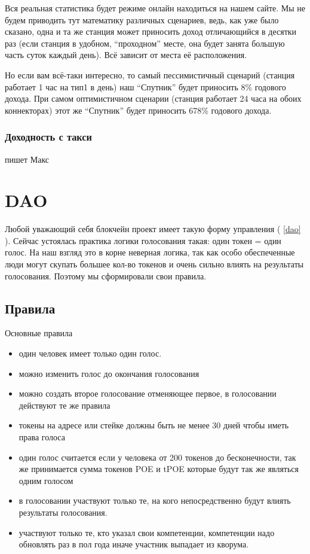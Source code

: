 \documentclass[a4paper,12pt]{report}
\begin{document}
Вся реальная статистика будет режиме онлайн находиться на нашем сайте. Мы не будем приводить тут математику различных сценариев, ведь, как уже было сказано, одна и та же станция может приносить доход отличающийся в десятки раз (если станция в удобном, “проходном” месте, она будет занята большую часть суток каждый день). Всё зависит от места её расположения.

Но если вам всё-таки интересно, то самый пессимистичный сценарий (станция работает 1 час на тип1 в день) наш “Спутник” будет приносить 8\% годового дохода. При самом оптимистичном сценарии (станция работает 24 часа на обоих коннекторах) этот же “Спутник” будет приносить 678\% годового дохода.


\subsection{Доходность с такси}

пишет Макс

\chapter{DAO}

Любой уважающий себя блокчейн проект имеет такую форму управления ( \ref{dao} ). Сейчас устоялась практика логики голосования такая: один токен = один голос. На наш взгляд это в корне неверная логика, так как особо обеспеченные люди могут скупать большее кол-во токенов и очень сильно влиять на результаты голосования. Поэтому мы сформировали свои правила.

\section{Правила}

Основные правила

\begin{itemize}
	\item один человек имеет только один голос.
	\item можно изменить голос до окончания голосования
	\item можно создать второе голосование отменяющее первое, в голосовании действуют те же правила
	\item токены на адресе или стейке должны быть не менее 30 дней чтобы иметь права голоса
	\item один голос считается если у человека от 200 токенов до бесконечности, так же принимается сумма токенов POE и tPOE которые будут так же являться одним голосом
	\item в голосовании участвуют только те, на кого непосредственно будут влиять результаты голосования.
	\item участвуют только те, кто указал свои компетенции, компетенции надо обновлять раз в пол года иначе участник выпадает из кворума.
	
\end{itemize}
\end{document}
